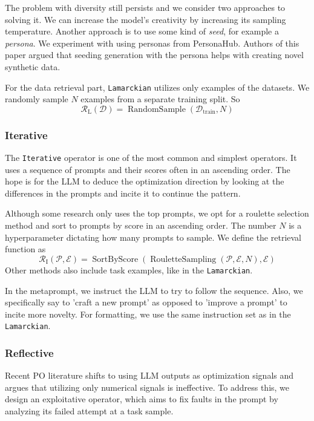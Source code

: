 The problem with diversity still persists and we consider two approaches to solving it. 
We can increase the model's creativity by increasing its sampling temperature. Another approach is to use
some kind of \textit{seed}, for example a \textit{persona}. We experiment with using personas from PersonaHub\cite{ge2024scalingsyntheticdatacreation}.
Authors of this paper argued that seeding generation with the persona helps with creating novel synthetic data. 

For the data retrieval part, \texttt{Lamarckian} utilizes only examples of the datasets. 
We randomly sample $N$ examples from a separate training split. So
\begin{equation}
    \mathcal{R}_{\text{L}}(\mathcal{D}) = \operatorname{RandomSample}(\mathcal{D}_{\text{train}}, N)
\end{equation}


\subsubsection{Iterative}
The \texttt{Iterative} operator is one of the most common and simplest operators. 
It uses a sequence of prompts and their scores often in an ascending order.
The hope is for the LLM to deduce the optimization direction by looking at the differences in the prompts and incite it to continue the pattern.

Although some research\cite{yang2024largelanguagemodelsoptimizers} only uses the top prompts, we opt for a roulette selection method
and sort to prompts by score in an ascending order. The number $N$ is a hyperparameter dictating how many prompts to sample.
We define the retrieval function as
\begin{equation}
   \mathcal{R}_{\text{I}}(\mathcal{P}, \mathcal{E}) = \operatorname{SortByScore}(\operatorname{RouletteSampling}(\mathcal{P}, \mathcal{E}, N), \mathcal{E})
\end{equation}
Other methods\cite{tang2024unleashingpotentiallargelanguage} also include task examples, like in the \texttt{Lamarckian}.

In the metaprompt, we instruct the LLM to try to follow the sequence. Also, we specifically say to 'craft a new prompt'
as opposed to 'improve a prompt' to incite more novelty. For formatting, we use the same instruction set as in the \texttt{Lamarckian}.

\subsubsection{Reflective}
Recent PO literature\cite{xiang2025selfsupervisedpromptoptimization} shifts to using LLM outputs as optimization signals
and argues that utilizing only numerical signals is ineffective. To address this, we design an exploitative operator, which
aims to fix faults in the prompt by analyzing its failed attempt at a task sample. 

